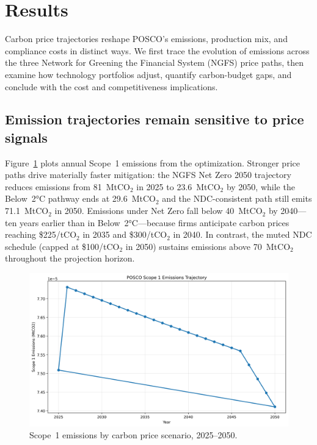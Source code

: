 \documentclass[preprint,1p,authoryear]{elsarticle}
\begin{document}
\section{Results}

Carbon price trajectories reshape POSCO's emissions, production mix, and compliance costs in distinct ways. We first trace the evolution of emissions across the three Network for Greening the Financial System (NGFS) price paths, then examine how technology portfolios adjust, quantify carbon-budget gaps, and conclude with the cost and competitiveness implications.

\subsection{Emission trajectories remain sensitive to price signals}

Figure~\ref{fig:scope1-by-scenario} plots annual Scope~1 emissions from the optimization. Stronger price paths drive materially faster mitigation: the NGFS Net Zero 2050 trajectory reduces emissions from 81~MtCO$_2$ in 2025 to 23.6~MtCO$_2$ by 2050, while the Below~2°C pathway ends at 29.6~MtCO$_2$ and the NDC-consistent path still emits 71.1~MtCO$_2$ in 2050. Emissions under Net Zero fall below 40~MtCO$_2$ by 2040—ten years earlier than in Below~2°C—because firms anticipate carbon prices reaching \$225/tCO$_2$ in 2035 and \$300/tCO$_2$ in 2040. In contrast, the muted NDC schedule (capped at \$100/tCO$_2$ in 2050) sustains emissions above 70~MtCO$_2$ throughout the projection horizon.

\begin{figure}[!t]
  \centering
  \includegraphics[width=0.8\linewidth]{scope1_by_scenario}
  \caption{Scope~1 emissions by carbon price scenario, 2025--2050.}
  \label{fig:scope1-by-scenario}
\end{figure}
\end{document}

